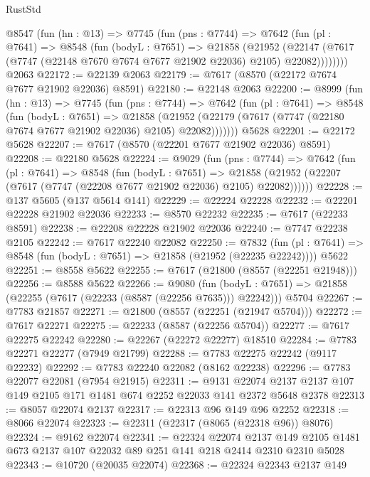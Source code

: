 \begin{lexlean}{RustStd}
\begin{coremodule}
    @8547
      (fun (hn : @13) =>
      @7745
        (fun (pns : @7744) =>
        @7642
          (fun (pl : @7641) =>
          @8548
            (fun (bodyL : @7651) =>
            @21858
              (@21952
                (@22147 (@7617 (@7747 (@22148 @7670 @7674 @7677 @21902 @22036) @2105) @22082))))))))
    @2063
@22172 := @22139 @2063
@22179 := @7617 (@8570 (@22172 @7674 @7677 @21902 @22036) @8591)
@22180 := @22148 @2063
@22200 := @8999
    (fun (hn : @13) =>
    @7745
      (fun (pns : @7744) =>
      @7642
        (fun (pl : @7641) =>
        @8548
          (fun (bodyL : @7651) =>
          @21858
            (@21952 (@22179 (@7617 (@7747 (@22180 @7674 @7677 @21902 @22036) @2105) @22082)))))))
    @5628
@22201 := @22172 @5628
@22207 := @7617 (@8570 (@22201 @7677 @21902 @22036) @8591)
@22208 := @22180 @5628
@22224 := @9029
    (fun (pns : @7744) =>
    @7642
      (fun (pl : @7641) =>
      @8548
        (fun (bodyL : @7651) =>
        @21858 (@21952 (@22207 (@7617 (@7747 (@22208 @7677 @21902 @22036) @2105) @22082))))))
@22228 := @137 @5605 (@137 @5614 @141)
@22229 := @22224 @22228
@22232 := @22201 @22228 @21902 @22036
@22233 := @8570 @22232
@22235 := @7617 (@22233 @8591)
@22238 := @22208 @22228 @21902 @22036
@22240 := @7747 @22238 @2105
@22242 := @7617 @22240 @22082
@22250 := @7832
    (fun (pl : @7641) => @8548 (fun (bodyL : @7651) => @21858 (@21952 (@22235 @22242))))
    @5622
@22251 := @8558 @5622
@22255 := @7617 (@21800 (@8557 (@22251 @21948)))
@22256 := @8588 @5622
@22266 := @9080
    (fun (bodyL : @7651) => @21858 (@22255 (@7617 (@22233 (@8587 (@22256 @7635))) @22242)))
    @5704
@22267 := @7783 @21857
@22271 := @21800 (@8557 (@22251 (@21947 @5704)))
@22272 := @7617 @22271
@22275 := @22233 (@8587 (@22256 @5704))
@22277 := @7617 @22275 @22242
@22280 := @22267 (@22272 @22277) @18510
@22284 := @7783 @22271 @22277 (@7949 @21799)
@22288 := @7783 @22275 @22242 (@9117 @22232)
@22292 := @7783 @22240 @22082 (@8162 @22238)
@22296 := @7783 @22077 @22081 (@7954 @21915)
@22311 := @9131
    @22074
    @2137
    @2137
    @107
    @149
    @2105
    @171
    @1481
    @674
    @2252
    @22033
    @141
    @2372
    @5648
    @2378
@22313 := @8057 @22074 @2137
@22317 := @22313 @96 @149 @96 @2252
@22318 := @8066 @22074
@22323 := @22311 (@22317 (@8065 (@22318 @96)) @8076)
@22324 := @9162 @22074
@22341 := @22324
    @22074
    @2137
    @149
    @2105
    @1481
    @673
    @2137
    @107
    @22032
    @89
    @251
    @141
    @218
    @2414
    @2310
    @2310
    @5028
@22343 := @10720 (@20035 @22074)
@22368 := @22324
    @22343
    @2137
    @149

\end{coremodule}
\end{lexlean}
